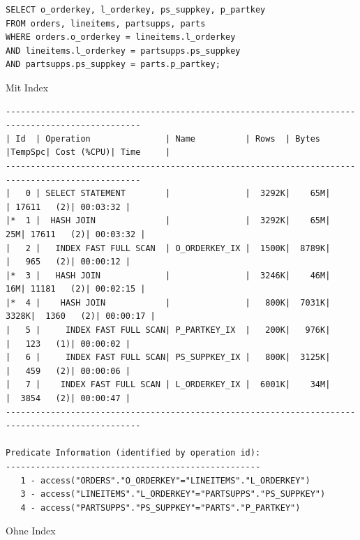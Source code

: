 \documentclass[10pt]{article}
\begin{document}
\begin{lstlisting}[style=sql]
SELECT o_orderkey, l_orderkey, ps_suppkey, p_partkey
FROM orders, lineitems, partsupps, parts
WHERE orders.o_orderkey = lineitems.l_orderkey
AND lineitems.l_orderkey = partsupps.ps_suppkey
AND partsupps.ps_suppkey = parts.p_partkey;
\end{lstlisting}
Mit Index
\begin{lstlisting}[style=queryexecutionplanSmall]
-------------------------------------------------------------------------------------------------
| Id  | Operation               | Name          | Rows  | Bytes |TempSpc| Cost (%CPU)| Time     |
-------------------------------------------------------------------------------------------------
|   0 | SELECT STATEMENT        |               |  3292K|    65M|       | 17611   (2)| 00:03:32 |
|*  1 |  HASH JOIN              |               |  3292K|    65M|    25M| 17611   (2)| 00:03:32 |
|   2 |   INDEX FAST FULL SCAN  | O_ORDERKEY_IX |  1500K|  8789K|       |   965   (2)| 00:00:12 |
|*  3 |   HASH JOIN             |               |  3246K|    46M|    16M| 11181   (2)| 00:02:15 |
|*  4 |    HASH JOIN            |               |   800K|  7031K|  3328K|  1360   (2)| 00:00:17 |
|   5 |     INDEX FAST FULL SCAN| P_PARTKEY_IX  |   200K|   976K|       |   123   (1)| 00:00:02 |
|   6 |     INDEX FAST FULL SCAN| PS_SUPPKEY_IX |   800K|  3125K|       |   459   (2)| 00:00:06 |
|   7 |    INDEX FAST FULL SCAN | L_ORDERKEY_IX |  6001K|    34M|       |  3854   (2)| 00:00:47 |
-------------------------------------------------------------------------------------------------
 
Predicate Information (identified by operation id):
---------------------------------------------------
   1 - access("ORDERS"."O_ORDERKEY"="LINEITEMS"."L_ORDERKEY")
   3 - access("LINEITEMS"."L_ORDERKEY"="PARTSUPPS"."PS_SUPPKEY")
   4 - access("PARTSUPPS"."PS_SUPPKEY"="PARTS"."P_PARTKEY")
\end{lstlisting}
Ohne Index
\end{document}

